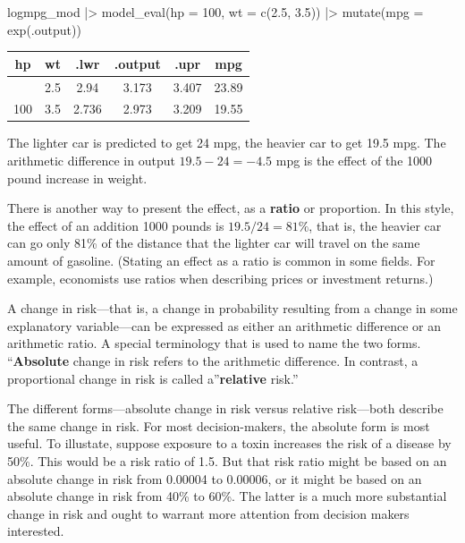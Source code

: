 \documentclass[
  letterpaper,
  DIV=11,
  numbers=noendperiod,
  oneside]{scrartcl}
\newenvironment{Shaded}{\begin{snugshade}}{\end{snugshade}}
\newcommand{\AttributeTok}[1]{\textcolor[rgb]{0.40,0.45,0.13}{#1}}
\newcommand{\DecValTok}[1]{\textcolor[rgb]{0.68,0.00,0.00}{#1}}
\newcommand{\FloatTok}[1]{\textcolor[rgb]{0.68,0.00,0.00}{#1}}
\newcommand{\FunctionTok}[1]{\textcolor[rgb]{0.28,0.35,0.67}{#1}}
\newcommand{\NormalTok}[1]{\textcolor[rgb]{0.00,0.23,0.31}{#1}}
\newcommand{\SpecialCharTok}[1]{\textcolor[rgb]{0.37,0.37,0.37}{#1}}
\begin{document}
\begin{Shaded}
\begin{Highlighting}[]
\NormalTok{logmpg\_mod }\SpecialCharTok{|\textgreater{}}
  \FunctionTok{model\_eval}\NormalTok{(}\AttributeTok{hp =} \DecValTok{100}\NormalTok{, }\AttributeTok{wt =} \FunctionTok{c}\NormalTok{(}\FloatTok{2.5}\NormalTok{, }\FloatTok{3.5}\NormalTok{)) }\SpecialCharTok{|\textgreater{}}
  \FunctionTok{mutate}\NormalTok{(}\AttributeTok{mpg =} \FunctionTok{exp}\NormalTok{(.output))}
\end{Highlighting}
\end{Shaded}

\begin{longtable}[]{@{}cccccc@{}}
\toprule\noalign{}
hp & wt & .lwr & .output & .upr & mpg \\
\midrule\noalign{}
\endhead
\bottomrule\noalign{}
\endlastfoot
100 & 2.5 & 2.94 & 3.173 & 3.407 & 23.89 \\
100 & 3.5 & 2.736 & 2.973 & 3.209 & 19.55 \\
\end{longtable}

The lighter car is predicted to get 24 mpg, the heavier car to get 19.5
mpg. The arithmetic difference in output \(19.5 - 24 = -4.5\) mpg is the
effect of the 1000 pound increase in weight.

There is another way to present the effect, as a \textbf{ratio} or
proportion. In this style, the effect of an addition 1000 pounds is
\(19.5 / 24 = 81\%\), that is, the heavier car can go only 81\% of the
distance that the lighter car will travel on the same amount of
gasoline. (Stating an effect as a ratio is common in some fields. For
example, economists use ratios when describing prices or investment
returns.)

A change in risk---that is, a change in probability resulting from a
change in some explanatory variable---can be expressed as either an
arithmetic difference or an arithmetic ratio. A special terminology that
is used to name the two forms. ``\textbf{Absolute} change in risk refers
to the arithmetic difference. In contrast, a proportional change in risk
is called a''\textbf{relative} risk.''

The different forms---absolute change in risk versus relative
risk---both describe the same change in risk. For most decision-makers,
the absolute form is most useful. To illustate, suppose exposure to a
toxin increases the risk of a disease by 50\%. This would be a risk
ratio of 1.5. But that risk ratio might be based on an absolute change
in risk from 0.00004 to 0.00006, or it might be based on an absolute
change in risk from 40\% to 60\%. The latter is a much more substantial
change in risk and ought to warrant more attention from decision makers
interested.
\end{document}
